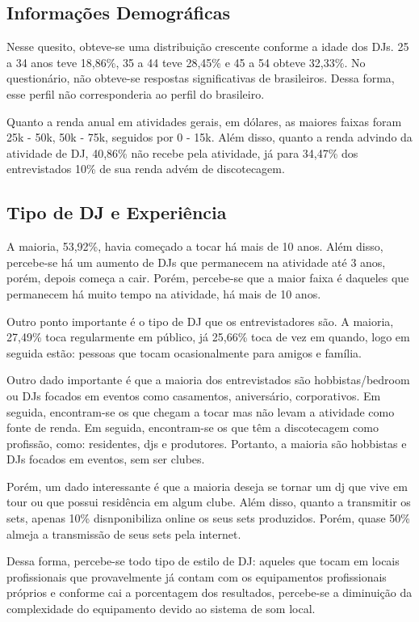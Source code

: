 \subsection{Informações Demográficas}
Nesse quesito, obteve-se uma distribuição crescente conforme a idade dos DJs. 25 a 34 anos teve 18,86\%, 35 a 44 teve 28,45\% e 45 a 54 obteve 32,33\%. No questionário, não obteve-se respostas significativas de brasileiros. Dessa forma, esse perfil não corresponderia ao perfil do brasileiro.
\par
Quanto a renda anual em atividades gerais, em dólares, as maiores faixas foram 25k - 50k, 50k - 75k, seguidos por 0 - 15k. Além disso, quanto a renda advindo da atividade de DJ, 40,86\% não recebe pela atividade, já para 34,47\% dos entrevistados 10\% de sua renda advém de discotecagem.

\subsection{Tipo de DJ e Experiência}
A maioria, 53,92\%, havia começado a tocar há mais de 10 anos. Além disso, percebe-se há um aumento de DJs que permanecem na atividade até 3 anos, porém, depois começa a cair. Porém, percebe-se que a maior faixa é daqueles que permanecem há muito tempo na atividade, há mais de 10 anos.
\par
Outro ponto importante é o tipo de DJ que os entrevistadores são. A maioria, 27,49\% toca regularmente em público, já 25,66\% toca de vez em quando, logo em seguida estão: pessoas que tocam ocasionalmente para amigos e família.
\par
Outro dado importante é que a maioria dos entrevistados são hobbistas/bedroom ou DJs focados em eventos como casamentos, aniversário, corporativos. Em seguida, encontram-se os que chegam a tocar mas não levam a atividade como fonte de renda. Em seguida, encontram-se os que têm a discotecagem como profissão, como: residentes, djs e produtores. Portanto, a maioria são hobbistas e DJs focados em eventos, sem ser clubes.
\par
Porém, um dado interessante é que a maioria deseja se tornar um dj que vive em tour ou que possui residência em algum clube. Além disso, quanto a transmitir os sets, apenas 10\% disnponibiliza online os seus sets produzidos. Porém, quase 50\% almeja a transmissão de seus sets pela internet.
\par
Dessa forma, percebe-se todo tipo de estilo de DJ: aqueles que tocam em locais profissionais que provavelmente já contam com os equipamentos profissionais próprios e conforme cai a porcentagem dos resultados, percebe-se a diminuição da complexidade do equipamento devido ao sistema de som local.

